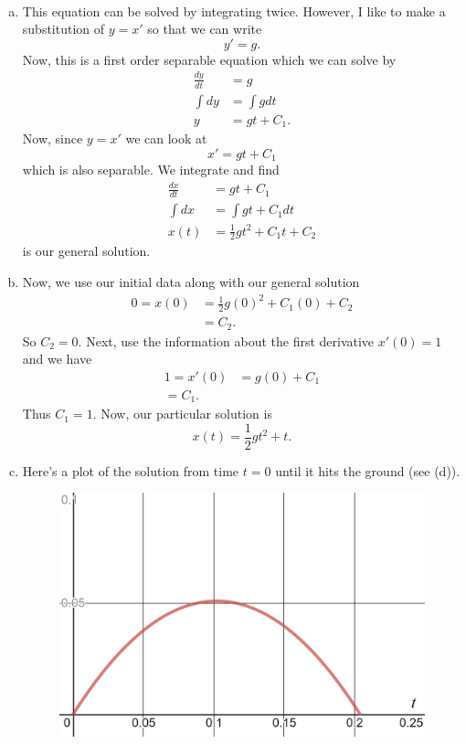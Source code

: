 \documentclass[12pt]{article} %
\begin{document}
\begin{solution}~
\begin{enumerate}[(a)]
    \item This equation can be solved by integrating twice.  However, I like to make a substitution of $y=x'$ so that we can write
    \[
    y'=g.
    \]
    Now, this is a first order separable equation which we can solve by
    \begin{align*}
        \frac{dy}{dt}&=g\\
        \int dy&= \int gdt\\
        y&= gt+C_1.
    \end{align*}
    Now, since $y=x'$ we can look at
    \[
    x'=gt+C_1
    \]
    which is also separable.  We integrate and find
    \begin{align*}
        \frac{dx}{dt}&=gt+C_1\\
        \int dx &= \int gt+C_1 dt\\
        x(t)&= \frac{1}{2}gt^2+C_1t+C_2
    \end{align*}
    is our general solution.
    \item Now, we use our initial data along with our general solution
    \begin{align*}
        0=x(0)&=\frac{1}{2}g(0)^2+C_1(0)+C_2\\
        &=C_2.
    \end{align*}
    So $C_2=0$. Next, use the information about the first derivative $x'(0)=1$ and we have
    \begin{align*}
        1=x'(0)&=g(0)+C_1\\
        =C_1.
    \end{align*}
    Thus $C_1=1$. Now, our particular solution is
    \[
    \boxed{x(t)=\frac{1}{2}gt^2+t.}
    \]
    \item Here's a plot of the solution from time $t=0$ until it hits the ground (see (d)).
    \begin{figure}[H]
        \centering
        \includegraphics[width=\textwidth]{Homework_2/projectile.png}

\end{figure}
\end{enumerate}
\end{solution}
\end{document}
